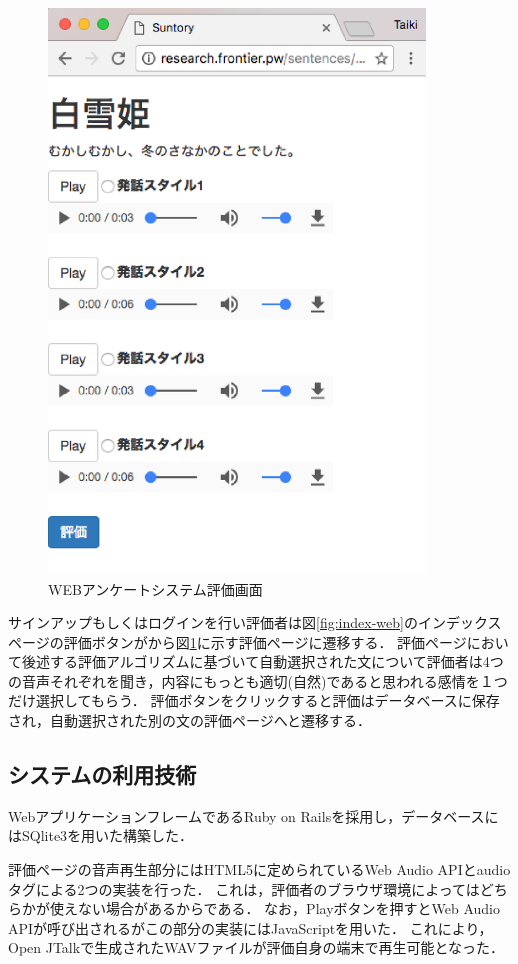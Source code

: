 \begin{figure}[h]
  \begin{center}
    \includegraphics[clip,width=10.0cm]{fig/web.eps}
    \caption{WEBアンケートシステム評価画面}
    \label{fig:web}
  \end{center}
\end{figure}
サインアップもしくはログインを行い評価者は図\ref{fig:index-web}のインデックスページの評価ボタンがから図\ref{fig:web}に示す評価ページに遷移する．
評価ページにおいて後述する評価アルゴリズムに基づいて自動選択された文について評価者は4つの音声それぞれを聞き，内容にもっとも適切(自然)であると思われる感情を１つだけ選択してもらう．
評価ボタンをクリックすると評価はデータベースに保存され，自動選択された別の文の評価ページへと遷移する．

\subsection{システムの利用技術}
WebアプリケーションフレームであるRuby on Rails\cite{rails}を採用し，データベースにはSQlite3\cite{sqlite}を用いた構築した．

評価ページの音声再生部分にはHTML5に定められているWeb Audio APIとaudioタグによる2つの実装を行った．
これは，評価者のブラウザ環境によってはどちらかが使えない場合があるからである．
なお，Playボタンを押すとWeb Audio APIが呼び出されるがこの部分の実装にはJavaScriptを用いた．
これにより，Open JTalkで生成されたWAVファイルが評価自身の端末で再生可能となった．

